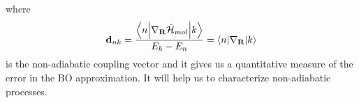 where 
\begin{equation}\label{NAC}
    \mathbf{d}_{nk} = \frac{\mel**{n}{\nabla_{\mathbf{R}}\mathcal{\hat{H}}_{mol}}{k}}{E_k - E_n} = \mel**{n}{\nabla_{\mathbf{R}}}{k}
\end{equation}
is the non-adiabatic coupling vector and it gives us a quantitative measure of the error in the BO approximation. It will help us to characterize non-adiabatic processes. 
